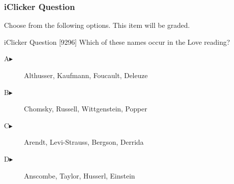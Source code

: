 \begin{frame}
  \frametitle{iClicker Question}
Choose from the following options. This item will be graded.
\begin{block}{iClicker Question}
[9296] Which of these names occur in the Love reading?
\end{block}
\begin{description}
\item[A\hspace{.2in}$\blacktriangleright$] Althusser, Kaufmann, Foucault, Deleuze
\item[B\hspace{.2in}$\blacktriangleright$] Chomsky, Russell, Wittgenstein, Popper
\item[C\hspace{.2in}$\blacktriangleright$] Arendt, Levi-Strauss, Bergson, Derrida
\item[D\hspace{.2in}$\blacktriangleright$] Anscombe, Taylor, Husserl, Einstein
\end{description}
\end{frame}